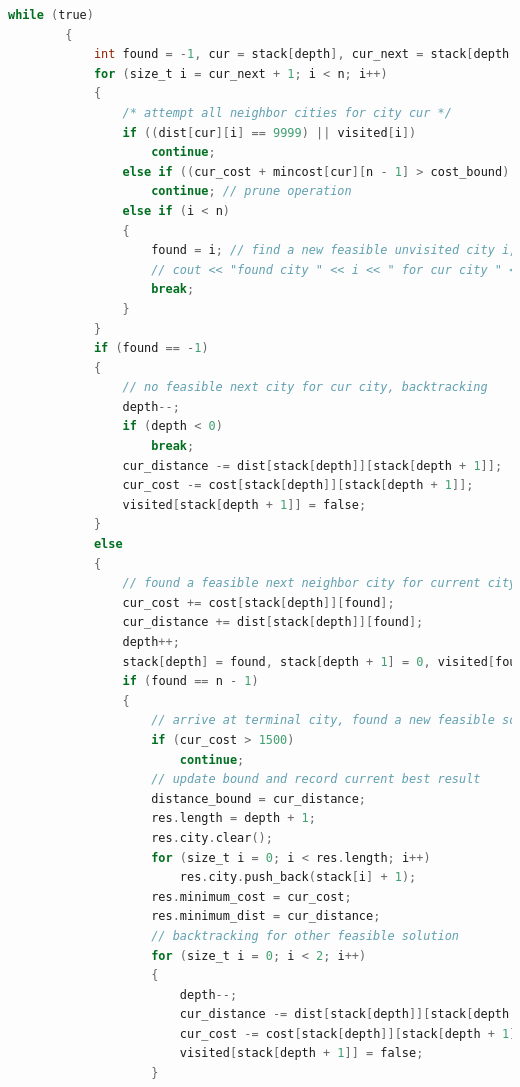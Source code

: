 \documentclass[a4paper,12pt]{article}
\begin{document}
\begin{lstlisting}[language=C]
        while (true)
        {
            int found = -1, cur = stack[depth], cur_next = stack[depth + 1];
            for (size_t i = cur_next + 1; i < n; i++)
            {
                /* attempt all neighbor cities for city cur */
                if ((dist[cur][i] == 9999) || visited[i])
                    continue;
                else if ((cur_cost + mincost[cur][n - 1] > cost_bound) || (cur_distance + mindist[cur][n - 1] > distance_bound))
                    continue; // prune operation
                else if (i < n)
                {
                    found = i; // find a new feasible unvisited city i, break the for loop
                    // cout << "found city " << i << " for cur city " << cur << endl;
                    break;
                }
            }
            if (found == -1)
            {
                // no feasible next city for cur city, backtracking
                depth--;
                if (depth < 0)
                    break;
                cur_distance -= dist[stack[depth]][stack[depth + 1]];
                cur_cost -= cost[stack[depth]][stack[depth + 1]];
                visited[stack[depth + 1]] = false;
            }
            else
            {
                // found a feasible next neighbor city for current city, update current path with cost, distance, path stack and visited record
                cur_cost += cost[stack[depth]][found];
                cur_distance += dist[stack[depth]][found];
                depth++;
                stack[depth] = found, stack[depth + 1] = 0, visited[found] = true;
                if (found == n - 1)
                {
                    // arrive at terminal city, found a new feasible solution
                    if (cur_cost > 1500)
                        continue;
                    // update bound and record current best result
                    distance_bound = cur_distance;
                    res.length = depth + 1;
                    res.city.clear();
                    for (size_t i = 0; i < res.length; i++)
                        res.city.push_back(stack[i] + 1);
                    res.minimum_cost = cur_cost;
                    res.minimum_dist = cur_distance;
                    // backtracking for other feasible solution
                    for (size_t i = 0; i < 2; i++)
                    {
                        depth--;
                        cur_distance -= dist[stack[depth]][stack[depth + 1]];
                        cur_cost -= cost[stack[depth]][stack[depth + 1]];
                        visited[stack[depth + 1]] = false;
                    }

\end{lstlisting}
\end{document}

